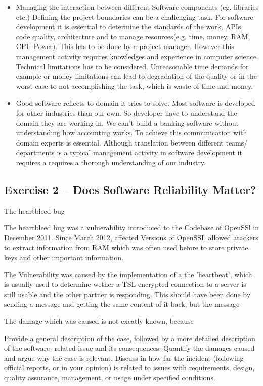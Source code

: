 \documentclass{scrartcl}
\begin{document}
\begin{itemize}
\item Managing the interaction between different Software components (eg. libraries etc.)
Defining the project boundaries can be a challenging task. 
For software development it is essential to determine the standards of the work,
APIs, code quality, architecture and to manage resources(e.g. time, money, RAM, CPU-Power). 
This has to be done by a project manager. However this management activity requires knowledges 
and experience in computer science. Technical limitations has to be considered. 
Unreasonable time demands for example or money limitations can lead to degradation of the quality 
or in the worst case to not accomplishing the task, which is waste of time and money.

\item Good software reflects to domain it tries to solve.
Most software is developed for other industries than our own. So developer have to understand the domain they are working in. We can't build a banking software without understanding how accounting works.
To achieve this communication with domain experts is essential. 
Although translation between different teams/ departments is a typical management activity in software development it requires a requires a thorough understanding of our industry.
\end{itemize}

\subsection*{Exercise 2 – Does Software Reliability Matter?}

The heartbleed bug

The heartbleed bug was a vulnerability introduced to the Codebase of OpenSSl in December 2011. Since March 2012, affected Versions of OpenSSL allowed atackers to extract information from RAM which was often used before to store private keys and other important information.

The Vulnerability was caused by the implementation of a the 'heartbeat', which is usually used to determine wether a TSL-encrypted connection to a server is still usable and the other partner is responding. This should have been done by sending a message and getting the same content of it back, but the message 

The damage which was caused is not excatly known, because


Provide a general description of the case, followed by a more detailed description of the software-
related issue and its consequences.
 Quantify the damages caused and argue why the case is relevant.
Discuss in how far the incident (following official reports, or in your opinion) is related to issues with
requirements, design, quality assurance, management, or usage under specified conditions.
\end{document}
